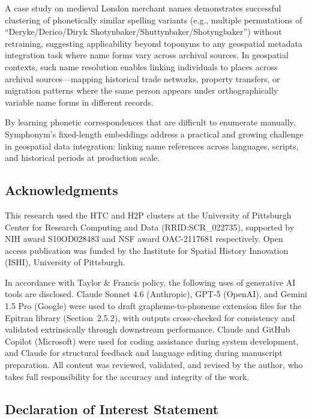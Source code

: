 \documentclass[11pt,a4paper]{article}
\begin{document}
A case study on medieval London merchant names demonstrates successful clustering of phonetically similar spelling variants (e.g., multiple permutations of ``Deryke/Derico/Diryk Shotynbaker/Shuttynbaker/Shotyngbaker'') without retraining, suggesting applicability beyond toponyms to any geospatial metadata integration task where name forms vary across archival sources. In geospatial contexts, such name resolution enables linking individuals to places across archival sources—mapping historical trade networks, property transfers, or migration patterns where the same person appears under orthographically variable name forms in different records.

By learning phonetic correspondences that are difficult to enumerate manually, Symphonym's fixed-length embeddings address a practical and growing challenge in geospatial data integration: linking name references across languages, scripts, and historical periods at production scale.

\subsection*{Acknowledgments}

This research used the HTC and H2P clusters at the University of Pittsburgh Center for Research Computing and Data (RRID:SCR\_022735), supported by NIH award S10OD028483 and NSF award OAC-2117681 respectively. Open access publication was funded by the Institute for Spatial History Innovation (ISHI), University of Pittsburgh.

In accordance with Taylor \& Francis policy, the following uses of generative AI tools are disclosed. Claude Sonnet 4.6 (Anthropic), GPT-5 (OpenAI), and Gemini 1.5 Pro (Google) were used to draft grapheme-to-phoneme extension files for the Epitran library (Section~2.5.2), with outputs cross-checked for consistency and validated extrinsically through downstream performance. Claude and GitHub Copilot (Microsoft) were used for coding assistance during system development, and Claude for structural feedback and language editing during manuscript preparation. All content was reviewed, validated, and revised by the author, who takes full responsibility for the accuracy and integrity of the work.

\subsection*{Declaration of Interest Statement}
\end{document}
